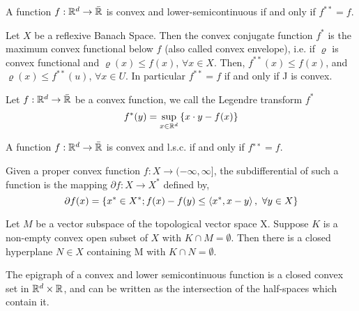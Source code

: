 \begin{theorem} 
	A function $f:\mathbb{R}^d \rightarrow \bar{\mathbb{R}}$ is convex and lower-semicontinuous if and only if $f^{**}=f$.
\end{theorem}
	
\begin{lemma}
	Let $X$ be a reflexive Banach Space. Then the convex conjugate function $f^*$ is the maximum convex functional below $f$ (also called convex envelope), i.e. if $\varrho$ is convex functional and $\varrho(x)\leq f(x)$, $\forall x \in X$. Then, $f^{**}(x)\leq f(x)$, and $\varrho(x)\leq f^{**}(u)$, $\forall x \in U $. In particular $f^{**} = f$ if and only if J is convex.
\end{lemma}

\begin{definition}
	Let $f: \mathbb{R}^d\rightarrow \bar{\mathbb{R}}$ be a convex function, we call the Legendre transform $f^*$
	\begin{equation*}
	f^*(y)=\sup_{x\in \mathbb{R}^d} \left\lbrace x\cdot y -f(x) \right\rbrace
	\end{equation*}
\end{definition}
\begin{corollary}
	A function $f:\mathbb{R}^d\rightarrow\bar{\mathbb{R}}$  is convex and l.s.c. if and only if $f^{∗∗}=f$.
\end{corollary}

\begin{definition}[Subdifferential]
	Given a proper convex function $f: X\rightarrow (-\infty, \infty]$, the subdifferential of such a function is the mapping $\partial f: X\rightarrow X^*$ defined by,
	\begin{equation*}
		\partial f (x)= \left\lbrace x^*\in X^*; f(x)-f(y) \leq \left\langle x^*, x-y \right\rangle,\ \forall y \in X \right\rbrace
	\end{equation*}
\end{definition}

\begin{theorem}
	Let $M$ be a vector subspace of the topological vector space X. Suppose $K$ is a non-empty convex open subset of $X$ with $K\cap M=\emptyset$. Then there is a closed hyperplane $N \in X$ containing M with $K \cap N = \emptyset$.
\end{theorem}

\begin{theorem}
	The epigraph of a convex and lower semicontinuous function is a closed convex set in
	$\mathbb{R}^d\times\mathbb{R}$, and can be written as the intersection of the half-spaces which contain it.
\end{theorem}
